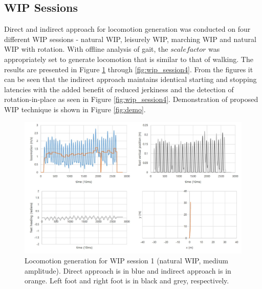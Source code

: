 \subsection{WIP Sessions}

Direct and indirect approach for locomotion generation was conducted on four different WIP sessions - natural WIP, leisurely WIP, marching WIP and natural WIP with rotation. With offline analysis of gait, the $scale factor$ was appropriately set to generate locomotion that is similar to that of walking. The results are presented in Figure \ref{fig:wip_session1} through \ref{fig:wip_session4}. From the figures it can be seen that the indirect approach maintains identical starting and stopping latencies with the added benefit of reduced jerkiness and the detection of rotation-in-place as seen in Figure \ref{fig:wip_session4}. Demonstration of proposed WIP technique is shown in Figure \ref{fig:demo}.

\begin{figure}[th]
\captionsetup{justification=raggedright,singlelinecheck=false}
\centering
\includegraphics[width=\textwidth,height=\textheight,keepaspectratio]{Figures/session1.jpg}
\decoRule
\caption[WIP session 1]{Locomotion generation for WIP session 1 (natural WIP, medium amplitude). Direct approach is in blue and indirect approach is in orange. Left foot and right foot is in black and grey, respectively.}
\label{fig:wip_session1}
\end{figure}


